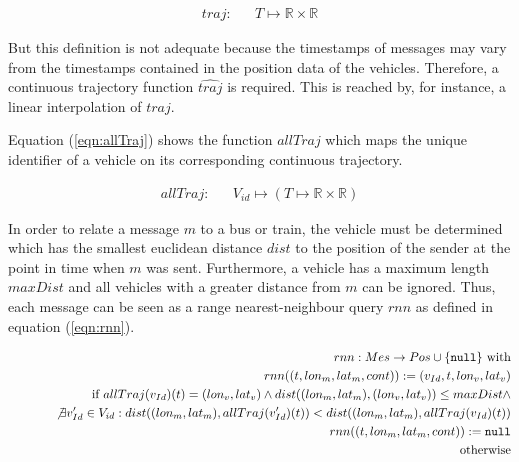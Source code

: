 \vspace*{-2\baselineskip}
\begin{eqnarray}
 traj: & & T \mapsto \mathbb{R} \times \mathbb{R}\label{eqn:traj}
\end{eqnarray}

But this definition is not adequate because the timestamps of messages may vary from the timestamps contained in the position data of the vehicles. Therefore, a continuous trajectory function $\widehat{traj}$ is required. This is reached by, for instance, a linear interpolation of $traj$.

Equation (\ref{eqn:allTraj}) shows the function $allTraj$ which maps the unique identifier of a vehicle on its corresponding continuous trajectory.

\vspace*{-2\baselineskip}
\begin{eqnarray}
 allTraj: & & V_{id} \mapsto (T \mapsto \mathbb{R} \times \mathbb{R})\label{eqn:allTraj}
\end{eqnarray}

In order to relate a message $m$ to a bus or train, the vehicle must be determined which has the smallest euclidean distance $dist$ to the position of the sender at the point in time when $m$ was sent. Furthermore, a vehicle has a maximum length $maxDist$ and all vehicles with a greater distance from $m$ can be ignored. Thus, each message can be seen as a range nearest-neighbour query $rnn$ as defined in equation (\ref{eqn:rnn}).

\vspace*{-2\baselineskip}
\begin{eqnarray}
 &&rnn: Mes \rightarrow Pos \cup \{\texttt{null}\} \textrm{ with}\label{eqn:rnn}\\
 &&rnn((t,lon_m,lat_m,cont)):= (v_{Id},t,lon_v,lat_v)\nonumber\\
 &&\hspace*{1cm}\textrm{if } allTraj(v_{Id})(t)=(lon_v,lat_v) \wedge dist((lon_m,lat_m),(lon_v,lat_v))\leq maxDist \wedge \nonumber\\
 &&\hspace*{1cm}\not\exists v_{Id}' \in V_{id}: dist((lon_m,lat_m),allTraj(v_{Id}')(t))< dist((lon_m,lat_m),allTraj(v_{Id})(t))\nonumber\\
 &&rnn((t,lon_m,lat_m,cont)):= \texttt{null}\nonumber\\
 &&\hspace*{1cm}\textrm{otherwise}\nonumber
\end{eqnarray}


